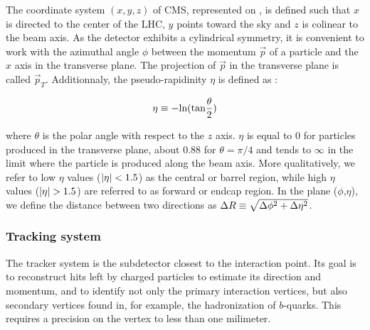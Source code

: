 
        The coordinate system $(x,y,z)$ of CMS, represented on ,
        is defined such that $x$ is directed to the center of the LHC, $y$ points toward
        the sky and $z$ is colinear to the beam axis. As the detector exhibits a
        cylindrical symmetry, it is convenient to work with the azimuthal angle $\phi$
        between the momentum $\vec{p}$ of a particle and the $x$ axis in the transverse
        plane. The projection of $\vec{p}$ in the transverse plane is called $\vec{p}_T$.
        Additionnaly, the pseudo-rapidinity $\eta$ is defined as :

        $$ \eta \equiv - \text{ln}(\text{tan}\frac{\theta}{2}) $$

        where $\theta$ is the polar angle with respect to the $z$ axis. $\eta$ is equal
        to 0 for particles produced in
        the transverse plane, about 0.88 for $\theta = \pi/4$ and tends to $\infty$ in the
        limit where the particle is produced along the beam axis. More qualitatively, we
        refer to low $\eta$ values ($\left| \eta \right| < 1.5$) as the central or barrel region, while
        high $\eta$ values ($\left| \eta \right| > 1.5$) are referred to as forward or endcap region.
        In the plane ($\phi$,$\eta$), we define the distance between two directions as
        $\Delta R \equiv \sqrt{\Delta\phi^2 + \Delta \eta^2}$.


            \subsubsection{Tracking system}

        The tracker system is the subdetector closest to the interaction point. Its goal
        is to reconstruct hits left by charged particles to estimate its direction
        and momentum, and to identify not only the primary interaction vertices, but also
        secondary vertices found in, for example, the hadronization of $b$-quarks. This requires
        a precision on the vertex to less than one milimeter.

